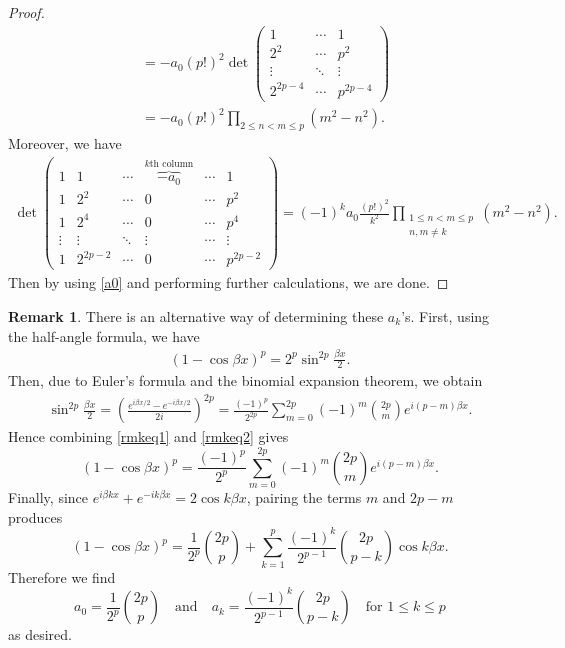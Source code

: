 \documentclass[12pt, reqno]{amsart}
\theoremstyle{plain}
\theoremstyle{definition}
\newtheorem{remark}[theorem]{Remark}
\begin{document}
\begin{proof}
\begin{align*}
        &=-a_0(p!)^2\det\begin{pmatrix}
            1 & \cdots & 1\\
            2^2 & \cdots & p^2\\
            \vdots & \ddots & \vdots\\
            2^{2p-4} & \cdots & p^{2p-4}
        \end{pmatrix}\\
        &=-a_0(p!)^2\prod_{2\le n<m\le p}(m^2-n^2).
    \end{align*}
    Moreover, we have
    \begin{align*}
        \det\begin{pmatrix}
				1&1&\cdots&\overbrace{-a_0}^{\text{$k$th column}}&\cdots&1\\
				1&2^2&\cdots&0&\cdots&p^2\\
				1&2^4&\cdots&0&\cdots&p^4\\
				\vdots&\vdots&\ddots&\vdots&\cdots&\vdots\\
				1&2^{2p-2}&\cdots&0&\cdots&p^{2p-2}
			\end{pmatrix}=(-1)^{k}a_0\frac{(p!)^2}{k^2}\prod_{\substack{1\le n<m\le p\\ n, m\ne k}}(m^2-n^2).
    \end{align*}
    Then by using \eqref{a0} and performing further calculations, we are done.
\end{proof}

\begin{remark}
    \label{explicita_k}
    There is an alternative way of determining these $a_k$'s.  First, using the half-angle formula, we have
    \begin{align}\label{rmkeq1}
        (1-\cos \beta x)^p=2^p\sin^{2p}\frac{\beta x}{2}.
    \end{align}
    Then, due to Euler's formula and the binomial expansion theorem, we obtain
    \begin{align}\label{rmkeq2}
        \sin^{2p}\frac{\beta x}{2}=\left(\frac{e^{i\beta x/2}-e^{-i\beta x/2}}{2i}\right)^{2p}=\frac{(-1)^p}{2^{2p}}\sum_{m=0}^{2p}(-1)^m\binom{2p}{m}e^{i(p-m)\beta x}.
    \end{align}
    Hence combining \eqref{rmkeq1} and \eqref{rmkeq2} gives
    \[(1-\cos\beta x)^p=\frac{(-1)^p}{2^p}\sum_{m=0}^{2p}(-1)^m\binom{2p}{m}e^{i(p-m)\beta x}.\]
    Finally, since $e^{i\beta kx}+e^{-ik\beta x}=2\cos k\beta x$, pairing the terms $m$ and $2p-m$ produces
    \[(1-\cos \beta x)^p=\frac{1}{2^p}\binom{2p}{p}+\sum_{k=1}^p\frac{(-1)^k}{2^{p-1}}\binom{2p}{p-k}\cos k\beta x.\]
    Therefore we find
    \[a_0=\frac{1}{2^p}\binom{2p}{p}\quad\text{and}\quad a_k=\frac{(-1)^k}{2^{p-1}}\binom{2p}{p-k}\quad\text{for } 1\le k\le p\]
    as desired.
\end{remark}
\end{document}
